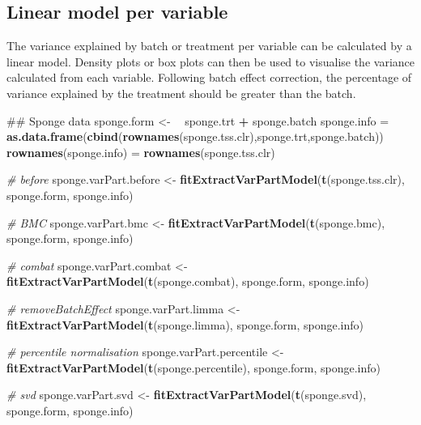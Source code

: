 \documentclass[]{book}
\newenvironment{Shaded}{\begin{snugshade}}{\end{snugshade}}
\newcommand{\KeywordTok}[1]{\textcolor[rgb]{0.13,0.29,0.53}{\textbf{#1}}}
\newcommand{\StringTok}[1]{\textcolor[rgb]{0.31,0.60,0.02}{#1}}
\newcommand{\CommentTok}[1]{\textcolor[rgb]{0.56,0.35,0.01}{\textit{#1}}}
\newcommand{\OperatorTok}[1]{\textcolor[rgb]{0.81,0.36,0.00}{\textbf{#1}}}
\newcommand{\ErrorTok}[1]{\textcolor[rgb]{0.64,0.00,0.00}{\textbf{#1}}}
\newcommand{\NormalTok}[1]{#1}
\begin{document}
\subsection{Linear model per variable}\label{linear-model-per-variable}

The variance explained by batch or treatment per variable can be
calculated by a linear model. Density plots or box plots can then be
used to visualise the variance calculated from each variable. Following
batch effect correction, the percentage of variance explained by the
treatment should be greater than the batch.

\begin{Shaded}
\begin{Highlighting}[]
\NormalTok{## Sponge data}
\NormalTok{sponge.form <-}\StringTok{ }\ErrorTok{~}\StringTok{ }\NormalTok{sponge.trt }\OperatorTok{+}\StringTok{ }\NormalTok{sponge.batch}
\NormalTok{sponge.info =}\StringTok{ }\KeywordTok{as.data.frame}\NormalTok{(}\KeywordTok{cbind}\NormalTok{(}\KeywordTok{rownames}\NormalTok{(sponge.tss.clr),sponge.trt,sponge.batch))}
\KeywordTok{rownames}\NormalTok{(sponge.info) =}\StringTok{ }\KeywordTok{rownames}\NormalTok{(sponge.tss.clr)}

\CommentTok{# before}
\NormalTok{sponge.varPart.before <-}\StringTok{ }\KeywordTok{fitExtractVarPartModel}\NormalTok{(}\KeywordTok{t}\NormalTok{(sponge.tss.clr), sponge.form, sponge.info)}

\CommentTok{# BMC}
\NormalTok{sponge.varPart.bmc <-}\StringTok{ }\KeywordTok{fitExtractVarPartModel}\NormalTok{(}\KeywordTok{t}\NormalTok{(sponge.bmc), sponge.form, sponge.info)}

\CommentTok{# combat}
\NormalTok{sponge.varPart.combat <-}\StringTok{ }\KeywordTok{fitExtractVarPartModel}\NormalTok{(}\KeywordTok{t}\NormalTok{(sponge.combat), sponge.form, sponge.info)}

\CommentTok{# removeBatchEffect}
\NormalTok{sponge.varPart.limma <-}\StringTok{ }\KeywordTok{fitExtractVarPartModel}\NormalTok{(}\KeywordTok{t}\NormalTok{(sponge.limma), sponge.form, sponge.info)}

\CommentTok{# percentile normalisation}
\NormalTok{sponge.varPart.percentile <-}\StringTok{ }\KeywordTok{fitExtractVarPartModel}\NormalTok{(}\KeywordTok{t}\NormalTok{(sponge.percentile), sponge.form, sponge.info)}

\CommentTok{# svd}
\NormalTok{sponge.varPart.svd <-}\StringTok{ }\KeywordTok{fitExtractVarPartModel}\NormalTok{(}\KeywordTok{t}\NormalTok{(sponge.svd), sponge.form, sponge.info)}



\end{Highlighting}
\end{Shaded}
\end{document}
